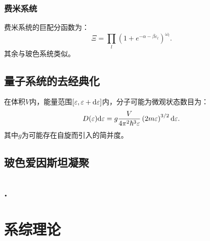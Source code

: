 \subsection{费米系统}
费米系统的巨配分函数为：
\begin{equation}
    \Xi=\prod_l\left(1+e^{-\alpha-\beta\varepsilon_l}\right)^{\omega_l}.
\end{equation}
其余与玻色系统类似。

\section{量子系统的去经典化}
在体积$V$内，能量范围$[\varepsilon,\varepsilon+\mathrm{d} \varepsilon]$内，分子可能为微观状态数目为：
\begin{equation}
D(\varepsilon)\mathrm{d} \varepsilon=g \frac{V}{4\pi^2\hbar^3\varepsilon}\left(2m\varepsilon\right)^{3/2}\mathrm{d}\varepsilon.    
\end{equation}
其中$g$为可能存在自旋而引入的简并度。

\section{玻色爱因斯坦凝聚}
\section{.}
\chapter{系综理论}